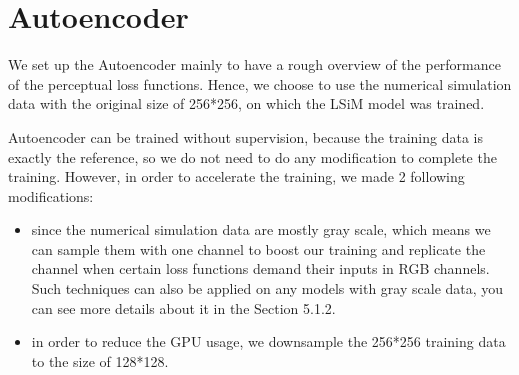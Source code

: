 \documentclass[a4paper,12pt,twoside]{report}
\begin{document}
\section{Autoencoder}
We set up the Autoencoder mainly to have a rough overview of the performance of the perceptual loss functions. Hence, we choose to use the numerical simulation data with the original size of 256*256, on which the LSiM model was trained. 

Autoencoder can be trained without supervision, because the training data is exactly the reference, so we do not need to do any modification to complete the training. However, in order to accelerate the training, we made 2 following modifications:
\begin{itemize}
\item since the numerical simulation data are mostly gray scale, which means we can sample them with one channel to boost our training and replicate the channel when certain loss functions demand their inputs in RGB channels. Such techniques can also be applied on any models with gray scale data, you can see more details about it in the Section 5.1.2.
\item in order to reduce the GPU usage, we downsample the 256*256 training data to the size of 128*128.

\end{itemize}
\end{document}
